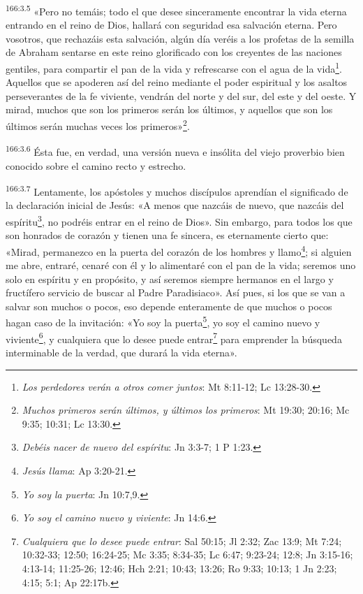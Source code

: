 \par 
\textsuperscript{166:3.5} «Pero no temáis; todo el que desee sinceramente encontrar la vida eterna entrando en el reino de Dios, hallará con seguridad esa salvación eterna. Pero vosotros, que rechazáis esta salvación, algún día veréis a los profetas de la semilla de Abraham sentarse en este reino glorificado con los creyentes de las naciones gentiles, para compartir el pan de la vida y refrescarse con el agua de la vida\footnote{\textit{Los perdedores verán a otros comer juntos}: Mt 8:11-12; Lc 13:28-30.}. Aquellos que se apoderen así del reino mediante el poder espiritual y los asaltos perseverantes de la fe viviente, vendrán del norte y del sur, del este y del oeste. Y mirad, muchos que son los primeros serán los últimos, y aquellos que son los últimos serán muchas veces los primeros»\footnote{\textit{Muchos primeros serán últimos, y últimos los primeros}: Mt 19:30; 20:16; Mc 9:35; 10:31; Lc 13:30.}.

\par 
\textsuperscript{166:3.6} Ésta fue, en verdad, una versión nueva e insólita del viejo proverbio bien conocido sobre el camino recto y estrecho.

\par 
\textsuperscript{166:3.7} Lentamente, los apóstoles y muchos discípulos aprendían el significado de la declaración inicial de Jesús: «A menos que nazcáis de nuevo, que nazcáis del espíritu\footnote{\textit{Debéis nacer de nuevo del espíritu}: Jn 3:3-7; 1 P 1:23.}, no podréis entrar en el reino de Dios». Sin embargo, para todos los que son honrados de corazón y tienen una fe sincera, es eternamente cierto que: «Mirad, permanezco en la puerta del corazón de los hombres y llamo\footnote{\textit{Jesús llama}: Ap 3:20-21.}; si alguien me abre, entraré, cenaré con él y lo alimentaré con el pan de la vida; seremos uno solo en espíritu y en propósito, y así seremos siempre hermanos en el largo y fructífero servicio de buscar al Padre Paradisiaco». Así pues, si los que se van a salvar son muchos o pocos, eso depende enteramente de que muchos o pocos hagan caso de la invitación: «Yo soy la puerta\footnote{\textit{Yo soy la puerta}: Jn 10:7,9.}, yo soy el camino nuevo y viviente\footnote{\textit{Yo soy el camino nuevo y viviente}: Jn 14:6.}, y cualquiera que lo desee puede entrar\footnote{\textit{Cualquiera que lo desee puede entrar}: Sal 50:15; Jl 2:32; Zac 13:9; Mt 7:24; 10:32-33; 12:50; 16:24-25; Mc 3:35; 8:34-35; Lc 6:47; 9:23-24; 12:8; Jn 3:15-16; 4:13-14; 11:25-26; 12:46; Hch 2:21; 10:43; 13:26; Ro 9:33; 10:13; 1 Jn 2:23; 4:15; 5:1; Ap 22:17b.} para emprender la búsqueda interminable de la verdad, que durará la vida eterna».


